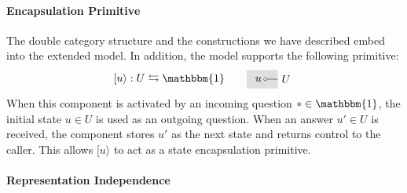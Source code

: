 \documentclass[acmsmall,screen,review,anonymous]{acmart}
\newcommand{\lensarrow}{\leftrightarrows}
\begin{document}

\paragraph{Encapsulation Primitive} %

The double category structure
and the constructions we have described
embed into the extended model.
In addition,
the model supports the following primitive:
\[
  [ u \rangle : U \lensarrow \mathbbm{1}
  \qquad
  \begin{tikzpicture}[xscale=0.4,yscale=0.3,baseline=(u.base)]
    \fill[tssdbg] (-1.5,-1) rectangle (1,1);
    \draw (0,0)
      node[draw,fill=white,circle,inner sep=1pt] {}
      node[left] (u) {$u$}
      -- (1,0) node[right]{$U$};
  \end{tikzpicture}
\]
When this component is activated
by an incoming question $* \in \mathbbm{1}$,
the initial state $u \in U$ is used
as an outgoing question.
When an answer $u' \in U$ is received,
the component stores $u'$ as the next state
and returns control to the caller.
This allows $[ u \rangle$ to act
as a state encapsulation primitive.


\paragraph{Representation Independence} %
\end{document}
